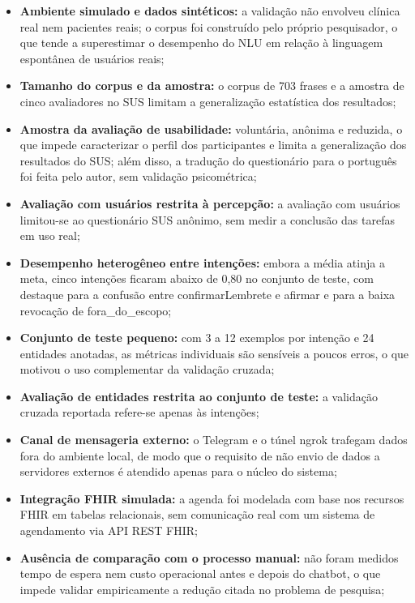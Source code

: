 \documentclass[12pt,a4paper]{extarticle}
\begin{document}
\begin{itemize}
    \item \textbf{Ambiente simulado e dados sintéticos:} a validação não envolveu clínica real nem pacientes reais; o corpus foi construído pelo próprio pesquisador, o que tende a superestimar o desempenho do NLU em relação à linguagem espontânea de usuários reais;
    \item \textbf{Tamanho do corpus e da amostra:} o corpus de 703 frases e a amostra de cinco avaliadores no SUS limitam a generalização estatística dos resultados;
    \item \textbf{Amostra da avaliação de usabilidade:} voluntária, anônima e reduzida, o que impede caracterizar o perfil dos participantes e limita a generalização dos resultados do SUS; além disso, a tradução do questionário para o português foi feita pelo autor, sem validação psicométrica;
    \item \textbf{Avaliação com usuários restrita à percepção:} a avaliação com usuários limitou-se ao questionário SUS anônimo, sem medir a conclusão das tarefas em uso real;
    \item \textbf{Desempenho heterogêneo entre intenções:} embora a média atinja a meta, cinco intenções ficaram abaixo de 0,80 no conjunto de teste, com destaque para a confusão entre confirmarLembrete e afirmar e para a baixa revocação de fora\_\allowbreak{}do\_\allowbreak{}escopo;
    \item \textbf{Conjunto de teste pequeno:} com 3 a 12 exemplos por intenção e 24 entidades anotadas, as métricas individuais são sensíveis a poucos erros, o que motivou o uso complementar da validação cruzada;
    \item \textbf{Avaliação de entidades restrita ao conjunto de teste:} a validação cruzada reportada refere-se apenas às intenções;
    \item \textbf{Canal de mensageria externo:} o Telegram e o túnel ngrok trafegam dados fora do ambiente local, de modo que o requisito de não envio de dados a servidores externos é atendido apenas para o núcleo do sistema;
    \item \textbf{Integração FHIR simulada:} a agenda foi modelada com base nos recursos FHIR em tabelas relacionais, sem comunicação real com um sistema de agendamento via API REST FHIR;
    \item \textbf{Ausência de comparação com o processo manual:} não foram medidos tempo de espera nem custo operacional antes e depois do chatbot, o que impede validar empiricamente a redução citada no problema de pesquisa;

\end{itemize}
\end{document}
